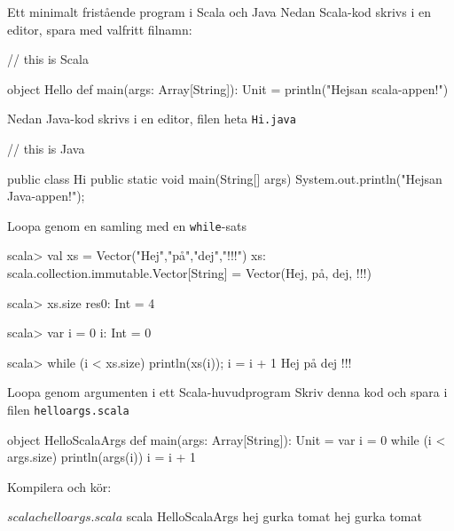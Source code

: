 
\begin{Slide}{Ett minimalt fristående program i Scala och Java}
Nedan Scala-kod skrivs i en editor, spara med valfritt filnamn:
\begin{Code}
// this is Scala 

object Hello {
  def main(args: Array[String]): Unit = {
    println("Hejsan scala-appen!")
  }
}
\end{Code}

\pause
\vspace{1em}
Nedan Java-kod skrivs i en editor, filen  heta \texttt{Hi.java}

\begin{Code}[language=Java]
// this is Java 

public class Hi {
    public static void main(String[] args) {
        System.out.println("Hejsan Java-appen!");
    }
}
\end{Code}

\end{Slide}


\begin{Slide}{Loopa genom en samling med en \texttt{while}-sats}
\begin{REPLnonum}
scala> val xs = Vector("Hej","på","dej","!!!")
xs: scala.collection.immutable.Vector[String] = 
  Vector(Hej, på, dej, !!!)

scala> xs.size
res0: Int = 4

scala> var i = 0
i: Int = 0

scala> while (i < xs.size) { println(xs(i)); i = i + 1 }
Hej
på
dej
!!!
\end{REPLnonum}
\end{Slide}


\begin{Slide}{Loopa genom argumenten i ett Scala-huvudprogram}
Skriv denna kod och spara i filen \texttt{helloargs.scala}
\begin{Code}
object HelloScalaArgs {
  def main(args: Array[String]): Unit = {
    var i = 0
    while (i < args.size) { 
      println(args(i))
      i = i + 1
    }
  }
}
\end{Code}
Kompilera och kör:
\begin{REPL}
$ scalac helloargs.scala
$ scala HelloScalaArgs hej gurka tomat 
hej
gurka
tomat
\end{REPL}
\end{Slide}



